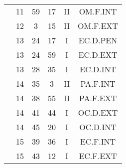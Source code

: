 \documentclass[12pt, a4paper]{article}
\begin{document}
\begin{multicols}{3}
{\begin{tabular}{c c c c c c}
	 	 	 	 & 11 & 59 & 17 & II & OM.F.INT\\%
	 	 	 	 & 12 & 3 & 15 & II & OM.F.EXT\\%
	 	 	 	 & 13 & 24 & 17 & I & EC.D.PEN\\%
	 	 	 	 & 13 & 24 & 59 & I & EC.D.EXT\\%
	 	 	 	 & 13 & 28 & 35 & I & EC.D.INT\\%
	 	 	 	 & 14 & 35 & 3 & II & PA.F.INT\\%
	 	 	 	 & 14 & 38 & 55 & II & PA.F.EXT\\%
	 	 	 	 & 14 & 41 & 44 & I & OC.D.EXT\\%
	 	 	 	 & 14 & 45 & 20 & I & OC.D.INT\\%
	 	 	 	 & 15 & 39 & 36 & I & EC.F.INT\\%
	 	 	 	 & 15 & 43 & 12 & I & EC.F.EXT\\%
	 	 \end{tabular}
 	}
\end{multicols}
\end{document}
